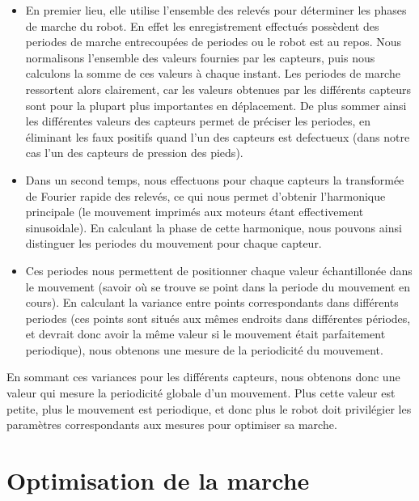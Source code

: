 \documentclass[11pt]{article}
\begin{document}
\begin{itemize}
\item En premier lieu, elle utilise l'ensemble des relevés pour déterminer les phases de marche du robot. En effet les enregistrement effectués possèdent des periodes de marche entrecoupées de periodes ou le robot est au repos. Nous normalisons l'ensemble des valeurs fournies par les capteurs, puis nous calculons la somme de ces valeurs à chaque instant. Les periodes de marche ressortent alors clairement, car les valeurs obtenues par les différents capteurs sont pour la plupart plus importantes en déplacement. De plus sommer ainsi les différentes valeurs des capteurs permet de préciser les periodes, en éliminant les faux positifs quand l'un des capteurs est defectueux (dans notre cas l'un des capteurs de pression des pieds).
\item Dans un second temps, nous effectuons pour chaque capteurs la transformée de Fourier rapide des relevés, ce qui nous permet d'obtenir l'harmonique principale (le mouvement imprimés aux moteurs étant effectivement sinusoidale). En calculant la phase de cette harmonique, nous pouvons ainsi distinguer les periodes du mouvement pour chaque capteur.
\item Ces periodes nous permettent de positionner chaque valeur échantillonée dans le mouvement (savoir où se trouve se point dans la periode du mouvement en cours). En calculant la variance entre points correspondants dans différents periodes (ces points sont situés aux mêmes endroits dans différentes périodes, et devrait donc avoir la même valeur si le mouvement était parfaitement periodique), nous obtenons une mesure de la periodicité du mouvement. 
\end{itemize}
En sommant ces variances pour les différents capteurs,
nous obtenons donc une valeur qui mesure la periodicité globale d'un mouvement. Plus cette valeur est petite, plus le mouvement est periodique, et donc plus le robot doit privilégier les paramètres correspondants aux mesures pour optimiser sa marche. 
\section{Optimisation de la marche}
\end{document}
